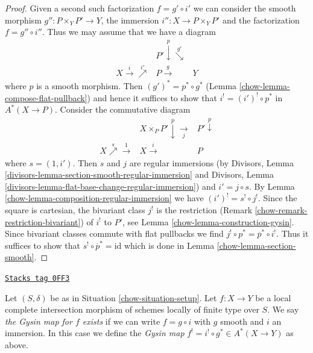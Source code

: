 \begin{proof}

Given a second such factorization $f = g' \circ i'$ we can
consider the smooth morphism $g'' : P \times_Y P' \to Y$, the
immersion $i'' : X \to P \times_Y P'$ and the factorization
$f = g'' \circ i''$. Thus we may assume that we have a diagram
$$
\begin{array}{ccc} & P' \overset{p}{\downarrow}\overset{g'}{\searrow} &  \\ X \overset{i}{\longrightarrow}\overset{i'}{\nearrow} & P \overset{g}{\longrightarrow} & Y\end{array}
$$
where $p$ is a smooth morphism. Then $(g')^* = p^* \circ g^*$
(Lemma \ref{chow-lemma-compose-flat-pullback}) and hence it suffices
to show that $i^! = (i')^! \circ p^*$
in $A^*(X \to P)$. Consider the commutative diagram
$$
\begin{array}{ccc} & X \times_P P' \overset{\overline{p}}{\downarrow}\underset{j}{\longrightarrow} & P' \overset{p}{\downarrow} \\ X \overset{s}{\nearrow}\overset{1}{\longrightarrow} & X \overset{i}{\longrightarrow} & P\end{array}
$$
where $s =(1, i')$. Then $s$ and $j$ are regular immersions
(by Divisors, Lemma \ref{divisors-lemma-section-smooth-regular-immersion}
and Divisors, Lemma \ref{divisors-lemma-flat-base-change-regular-immersion})
and $i' = j \circ s$. By Lemma \ref{chow-lemma-composition-regular-immersion}
we have $(i')^! = s^! \circ j^!$.
Since the square is cartesian, the bivariant class $j^!$
is the restriction (Remark \ref{chow-remark-restriction-bivariant})
of $i^!$ to $P'$, see Lemma \ref{chow-lemma-construction-gysin}.
Since bivariant classes commute with flat pullbacks
we find $j^! \circ p^* = \overline{p}^* \circ i^!$.
Thus it suffices to show that $s^! \circ \overline{p}^* = \text{id}$
which is done in Lemma \ref{chow-lemma-section-smooth}.
\end{proof}

\begin{definition}
\label{chow-definition-lci-gysin}
\href{https://stacks.math.columbia.edu/tag/0FF3}{\texttt{Stacks tag 0FF3}}

Let $(S, \delta)$ be as in Situation \ref{chow-situation-setup}.
Let $f : X \to Y$ be a local complete intersection morphism
of schemes locally of finite type over $S$. We say
{\it the Gysin map for $f$ exists} if we can write
$f = g \circ i$ with $g$ smooth and $i$ an immersion.
In this case we define the
{\it Gysin map} $f^! = i^! \circ g^* \in A^*(X \to Y)$ as above.
\end{definition}

